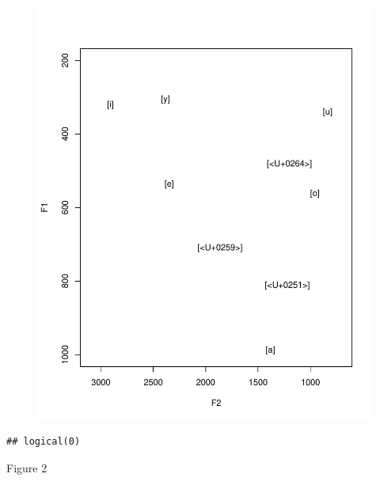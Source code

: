\documentclass[man, fleqn, noextraspace]{apa6}
\begin{document}
\begin{figure}
\centering
\includegraphics{Vowel_v2_files/figure-latex/figure2-1.pdf}
\caption{}
\end{figure}

\begin{verbatim}
## logical(0)
\end{verbatim}

Figure 2
\end{document}
